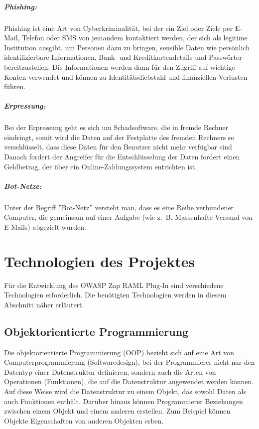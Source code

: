 \subparagraph{Phishing: }

Phishing ist eine Art von Cyberkriminalität, bei der ein Ziel oder Ziele per E-Mail, Telefon oder SMS von jemandem kontaktiert werden, der sich als legitime Institution ausgibt, um Personen dazu zu bringen, sensible Daten wie persönlich identifizierbare Informationen, Bank- und Kreditkartendetails und Passwörter bereitzustellen. Die Informationen werden dann für den Zugriff auf wichtige Konten verwendet und können zu Identitätsdiebstahl und finanziellen Verlusten führen\cite{phishing17ph}.

\subparagraph{Erpressung: }

Bei der Erpressung geht es sich um Schadsoftware, die in fremde Rechner eindringt, somit wird die Daten auf der Festplatte des fremden Rechners so verschlüsselt, dass diese Daten für den Benutzer nicht mehr verfügbar sind Danach fordert der Angreifer für die Entschlüsselung der Daten fordert einen Geldbetrag, der über ein Online-Zahlungssystem entrichten ist\cite[48]{eckert2013sicherheit}.

\subparagraph{Bot-Netze: }

Unter der Begriff ''Bot-Netz'' versteht man, dass es eine Reihe verbundener Computer, die gemeinsam auf einer Aufgabe (wie z. B. Massenhafte Versand von E-Mails) abgezielt wurden\cite{botnetz17symantec}.

\section{Technologien des Projektes}

Für die Entwicklung des OWASP Zap RAML Plug-In sind verschiedene Technologien erforderlich. Die benötigten Technologien werden in diesem Abschnitt näher erläutert.

\subsection{Objektorientierte Programmierung}

Die objektorientierte Programmierung (OOP) bezieht sich auf eine Art von Computerprogrammierung (Softwaredesign), bei der Programmierer nicht nur den Datentyp einer Datenstruktur definieren, sondern auch die Arten von Operationen (Funktionen), die auf die Datenstruktur angewendet werden können. Auf diese Weise wird die Datenstruktur zu einem Objekt, das sowohl Daten als auch Funktionen enthält. Darüber hinaus können Programmierer Beziehungen zwischen einem Objekt und einem anderen erstellen. Zum Beispiel können Objekte Eigenschaften von anderen Objekten erben\cite{oop15beal}.

